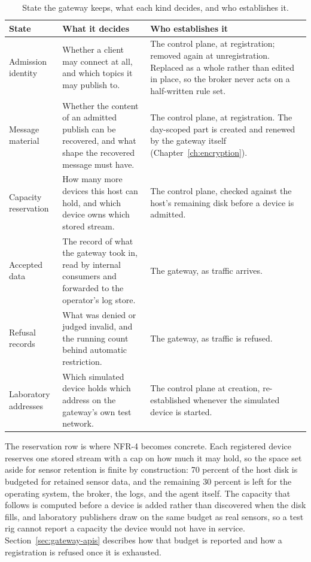 \documentclass[12pt,a4paper]{report}
\begin{document}
\begin{table}[H]
\centering
{\small
\begin{tabularx}{\textwidth}{@{}p{3.9cm}Yp{4.0cm}@{}}
\toprule
\textbf{State} & \textbf{What it decides} & \textbf{Who establishes it} \\
\midrule
Admission identity &
Whether a client may connect at all, and which topics it may publish
to. &
The control plane, at registration; removed again at unregistration.
Replaced as a whole rather than edited in place, so the broker never
acts on a half-written rule set. \\
\midrule
Message material &
Whether the content of an admitted publish can be recovered, and
what shape the recovered message must have. &
The control plane, at registration. The day-scoped part is created
and renewed by the gateway itself (Chapter~\ref{ch:encryption}). \\
\midrule
Capacity reservation &
How many more devices this host can hold, and which device owns
which stored stream. &
The control plane, checked against the host's remaining disk before
a device is admitted. \\
\midrule
Accepted data &
The record of what the gateway took in, read by internal consumers
and forwarded to the operator's log store. &
The gateway, as traffic arrives. \\
\midrule
Refusal records &
What was denied or judged invalid, and the running count behind
automatic restriction. &
The gateway, as traffic is refused. \\
\midrule
Laboratory addresses &
Which simulated device holds which address on the gateway's own test
network. &
The control plane at creation, re-established whenever the simulated
device is started. \\
\bottomrule
\end{tabularx}}
\caption{State the gateway keeps, what each kind decides, and who
establishes it.}
\label{tab:gw-state}
\end{table}

The reservation row is where NFR-4 becomes concrete. Each registered
device reserves one stored stream with a cap on how much it may
hold, so the space set aside for sensor retention is finite by
construction: 70 percent of the host disk is budgeted for retained
sensor data, and the remaining 30 percent is left for the operating
system, the broker, the logs, and the agent itself. The capacity
that follows is computed before a device is added rather than
discovered when the disk fills, and laboratory publishers draw on the
same budget as real sensors, so a test rig cannot report a capacity
the device would not have in service. Section~\ref{sec:gateway-apis}
describes how that budget is reported and how a registration is
refused once it is exhausted.
\end{document}
